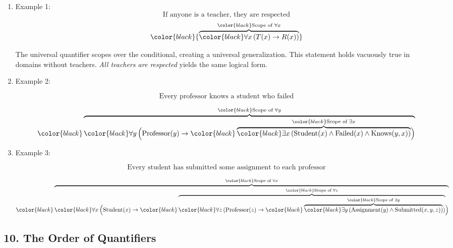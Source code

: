 \begin{enumerate}
\def\labelenumi{\arabic{enumi}.}
\item
  Example 1: \[\text{If anyone is a teacher, they are respected}\] \[
   \color{black}{\overbrace{\color{black}\forall x \, (T(x) \to R(x))}^{\color{black}\text{Scope of } \forall x}}
   \]

  The universal quantifier scopes over the conditional, creating a
  universal generalization. This statement holds vacuously true in
  domains without teachers. \emph{All teachers are respected} yields the
  same logical form.
\item
  Example 2:

  \[\text{Every professor knows a student who failed}\]

  \[
   {\color{black}\overbrace{\color{black}\forall y \, \Big( \text{Professor}(y) \rightarrow
   {\color{black}\overbrace{\color{black}\exists x \, (\text{Student}(x) \wedge \text{Failed}(x) \wedge \text{Knows}(y,x))}^{\color{black}\text{Scope of } \exists x}} \Big)}^{\color{black}\text{Scope of } \forall y}}
   \]
\item
  Example 3:

  \[\text{Every student has submitted some assignment to each professor}\]

  \[
   {\color{black}\overbrace{\color{black}\forall x \, \Big( \text{Student}(x) \rightarrow
   {\color{black}\overbrace{\color{black}\forall z \, (\text{Professor}(z) \rightarrow 
   {\color{black}\overbrace{\color{black}\exists y \, (\text{Assignment}(y) \wedge \text{Submitted}(x,y,z))}^{\color{black}\text{Scope of } \exists y}})}^{\color{black}\text{Scope of } \forall z}} \Big)}^{\color{black}\text{Scope of } \forall x}}
   \]
\end{enumerate}

\subsection{10. The Order of
Quantifiers}\label{the-order-of-quantifiers}


